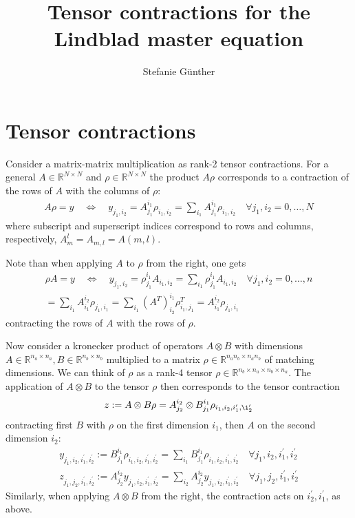 \documentclass[letterpaper]{article}
\title{Tensor contractions for the Lindblad master equation}
\author{Stefanie G{\"u}nther}
\newcommand{\R}{\mathds{R}}
\begin{document}
\maketitle

\section{Tensor contractions}
Consider a matrix-matrix multiplication as rank-2 tensor contractions. For a general $A\in \R^{N\times N}$ and $\rho\in \R^{N\times N}$ the product $A\rho$ corresponds to a contraction of the rows of $A$ with the columns of $\rho$:
\begin{align}
    A \rho = y \quad \Leftrightarrow \quad y_{j_1,i_2} = A_{j_1}^{i_1} \rho_{i_1,i_2} = \sum_{i_1} A_{j_1}^{i_1} \rho_{i_1,i_2} \quad \forall j_1,i_2 = 0,\dots, N
\end{align}
where subscript and superscript indices correspond to rows and columns, respectively, $A_m^l = A_{m,l} = A(m,l)$. 

Note than when applying $A$ to $\rho$ from the right, one gets 
\begin{align}
    \rho A = y \quad \Leftrightarrow \quad y_{j_1,i_2} = \rho_{j_1}^{i_1} A_{i_1,i_2} = \sum_{i_1} \rho_{j_1}^{i_1} A_{i_1,i_2} \quad \forall j_1,i_2 = 0,\dots, n \\
   = \sum_{i_1} A_{i_1}^{i_2} \rho_{j_1,i_1} = \sum_{i_1} (A^T)_{i_2}^{i_1} \rho^T_{i_1,j_1} = A_{i_1}^{i_2} \rho_{j_1,i_1}
\end{align}
contracting the rows of $A$ with the rows of $\rho$. 

Now consider a kronecker product of operators $A\otimes B$ with dimensions $A\in\R^{n_a\times n_a}, B\in\R^{n_b\times n_b}$ multiplied to a matrix $\rho \in \R^{n_an_b\times n_an_b}$ of matching dimensions. We can think of $\rho$ as a rank-4 tensor $\rho\in\R^{n_b\times n_a \times n_b \times n_a}$. The application of $A\otimes B$ to the tensor $\rho$ then corresponds to the tensor contraction 
\begin{align}
    z := A\otimes B \rho = A_{j_2}^{i_2}\otimes B_{j_1}^{i_1} \rho_{i_1, i_2, i_1^{\prime}, \i_2^{\prime}}
\end{align}
contracting first $B$ with $\rho$ on the first dimension $i_1$, then $A$ on the second dimension $i_2$:
\begin{align}
    y_{j_1, i_2, i_1^{\prime}, i_2^{\prime}} := B_{j_1}^{i_1} \rho_{i_1, i_2, i_1^{\prime}, i_2^{\prime}} = \sum_{i_1} B_{j_1}^{i_1} \rho_{i_1, i_2, i_1^{\prime}, i_2^{\prime}} \quad \forall j_1,i_2,i_1^\prime, i_2^\prime\\
    z_{j_1, j_2, i_1^{\prime}, i_2^{\prime}} := A_{j_2}^{i_2} y_{j_1, i_2, i_1^{\prime}, i_2^{\prime}} = \sum_{i_2} A_{j_2}^{i_2} y_{j_1, i_2, i_1^{\prime}, i_2^{\prime}} \quad \forall j_1,j_2,i_1^\prime, i_2^\prime
\end{align}
Similarly, when applying $A\otimes B$ from the right, the contraction acts on $i_2^\prime, i_1^\prime$, as above. 
\end{document}
